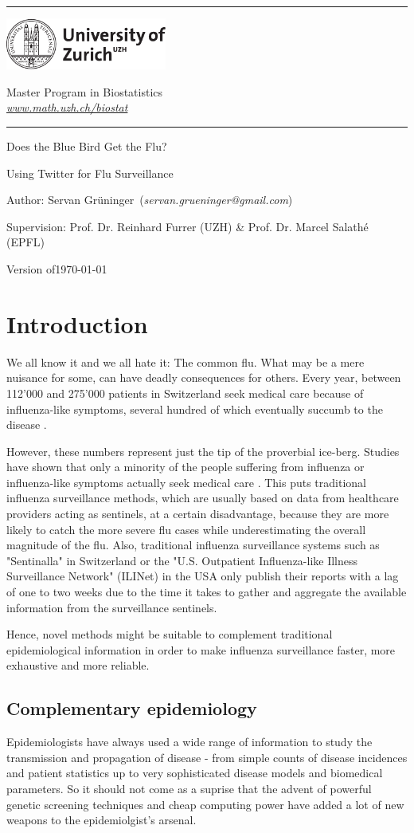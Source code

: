 \documentclass[11pt, a4paper]{article}\usepackage[]{graphicx}\usepackage[]{color}
\makeatletter
\newcommand{\name}{Servan Grüninger}
\newcommand{\mail}{servan.grueninger@gmail.com}
\newcommand{\versiondate}{\today}
\newcommand{\supervisor}{Prof. Dr. Reinhard Furrer (UZH) \& Prof. Dr. Marcel Salathé (EPFL)}
\newcommand{\bigtitle}{Does the Blue Bird Get the Flu?}
\newcommand{\subtitle}{Using Twitter for Flu Surveillance}
\newcommand{\web}{www.math.uzh.ch/biostat}
\newcommand{\grp}{Master Program in Biostatistics}
\newcommand{\img}{\includegraphics[height=17mm, width = 53mm]{gfx/uzh_logo_e_pos}}
\newcommand{\of}{of\xspace}
\newcommand{\HRule}{\rule{\linewidth}{0.5mm}}
\newcommand{\mytitle}[3]{
\begin{center}
\vspace*{-2.1cm}

\HRule

\vspace*{0.4cm}

\begin{minipage}{0.4\textwidth}
\thispagestyle{empty}
\begin{flushleft}
\hspace*{1cm}\img
\end{flushleft}
\end{minipage}
\begin{minipage}{0.59\textwidth}
\begin{flushleft} \large
    \hspace*{3.8cm} \textsf{\grp} \\
    \hspace*{3.8cm} \href{http://\web}{\textsf{\emph{\web}}}
\end{flushleft}
\end{minipage}

\vspace*{0.4cm} \HRule

\bigskip

\textsf{\LARGE #1} \vspace*{0.5cm}

\Large{#2}

\medskip

\large{Author: \name \ (\textit{\mail})}

\medskip

\large{Supervision: \supervisor}

\medskip

Version \of \versiondate

\end{center}

\medskip
}
\makeatother
\begin{document}
\pagestyle{standard}
\mytitle{\bigtitle}{\subtitle}


\tableofcontents
\newpage

\section{Introduction}
\label{intro}

We all know it and we all hate it: The common flu. What may be a mere nuisance for some, can have deadly consequences for others. Every year, between 112'000 and 275'000 patients in Switzerland seek medical care because of influenza-like symptoms, several hundred of which eventually succumb to the disease \citep{bundesamt_fur_gesundheit_saisonale_2016}. 

However, these numbers represent just the tip of the proverbial ice-berg. Studies have shown that only a minority of the people suffering from influenza or influenza-like symptoms actually seek medical care \citep{goff_surveillance_2015}. This puts traditional influenza surveillance methods, which are usually based on data from healthcare providers acting as sentinels, at a certain disadvantage, because they are more likely to catch the more severe flu cases while underestimating the overall magnitude of the flu. Also, traditional influenza surveillance systems such as "Sentinalla" in Switzerland \citep{bundesamt_fur_gesundheit_saisonale_2016-1} or the "U.S. Outpatient Influenza-like Illness Surveillance Network" (ILINet) in the USA \citep{centers_for_disease_control_and_prevention_overview_2016} only publish their reports with a lag of one to two weeks due to the time it takes to gather and aggregate the available information from the surveillance sentinels.

Hence, novel methods might be suitable to complement traditional epidemiological information in order to make influenza surveillance faster, more exhaustive and more reliable. 

\subsection{Complementary epidemiology}
Epidemiologists have always used a wide range of information to study the transmission and propagation of disease - from simple counts of disease incidences and patient statistics up to very sophisticated disease models and biomedical parameters. So it should not come as a suprise that the advent of powerful genetic screening techniques and cheap computing power have added a lot of new weapons to the epidemiolgist's arsenal.\newline
\end{document}
